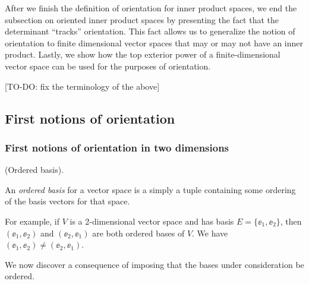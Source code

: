 After we finish the definition of orientation for inner product spaces, we end the subsection on oriented inner product spaces by presenting the fact that the determinant ``tracks'' orientation. This fact allows us to generalize the notion of orientation to finite dimensional vector spaces that may or may not have an inner product. Lastly, we show how the top exterior power of a finite-dimensional vector space can be used for the purposes of orientation.

[TO-DO: fix the terminology of the above]

\subsection*{First notions of orientation}

\subsubsection*{First notions of orientation in two dimensions}

\begin{defn}
    (Ordered basis).
    
    An \textit{ordered basis} for a vector space is a simply a tuple containing some ordering of the basis vectors for that space.
    
    For example, if $V$ is a 2-dimensional vector space and has basis $E = \{\ee_1, \ee_2\}$, then $(\ee_1, \ee_2)$ and $(\ee_2, \ee_1)$ are both ordered bases of $V$. We have $(\ee_1, \ee_2) \neq (\ee_2, \ee_1)$.
\end{defn}

We now discover a consequence of imposing that the bases under consideration be ordered.


